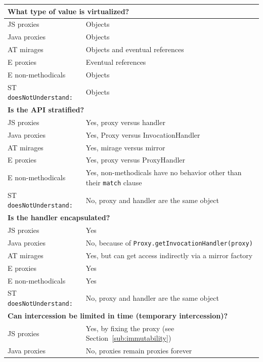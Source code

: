 \documentclass{acm_proc_article-sp}
\begin{document}
\begin{table}
\centering
\begin{tabular}{|p{}|p{}|}
    \hline
    \multicolumn{2}{|l|}{\textbf{What type of value is virtualized?}}\\
    \hline
    JS proxies        & Objects\\
    Java proxies      & Objects\\
    AT mirages        & Objects and eventual references\\
    E proxies         & Eventual references\\
    E non-methodicals & Objects\\
    ST \texttt{doesNotUnderstand:}  & Objects\\
    \hline
    \multicolumn{2}{|l|}{\textbf{Is the API stratified?}}\\
    \hline
    JS proxies        & Yes, proxy versus handler\\
    Java proxies      & Yes, Proxy versus InvocationHandler\\
    AT mirages        & Yes, mirage versus mirror\\
    E proxies         & Yes, proxy versus ProxyHandler\\
    E non-methodicals & Yes, non-methodicals have no behavior other than their \texttt{match} clause\\
    ST \texttt{doesNotUnderstand:}  & No, proxy and handler are the same object\\
    \hline
    \multicolumn{2}{|l|}{\textbf{Is the handler encapsulated?}}\\
    \hline
    JS proxies        & Yes\\
    Java proxies      & No, because of \texttt{Proxy.getInvocationHandler(proxy)}\\
    AT mirages        & Yes, but can get access indirectly via a mirror factory\\
    E proxies         & Yes\\
    E non-methodicals & Yes\\
    ST \texttt{doesNotUnderstand:}  & No, proxy and handler are the same object\\
    \hline
    \multicolumn{2}{|l|}{\textbf{Can intercession be limited in time (temporary intercession)?}}\\
    \hline
    JS proxies        & Yes, by fixing the proxy (see Section~\ref{sub:immutability})\\
    Java proxies      & No, proxies remain proxies forever\\

\end{tabular}
\end{table}
\end{document}
